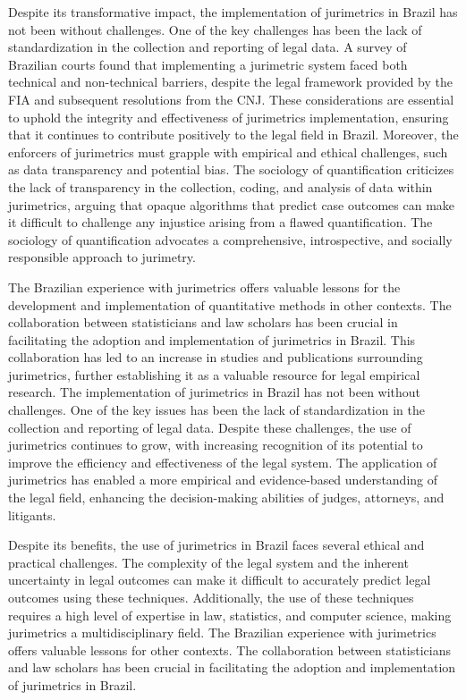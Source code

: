 Despite its transformative impact, the implementation of jurimetrics in Brazil has not been without challenges. One of the key challenges has been the lack of standardization in the collection and reporting of legal data. A survey of Brazilian courts found that implementing a jurimetric system faced both technical and non-technical barriers, despite the legal framework provided by the FIA and subsequent resolutions from the CNJ. These considerations are essential to uphold the integrity and effectiveness of jurimetrics implementation, ensuring that it continues to contribute positively to the legal field in Brazil. Moreover, the enforcers of jurimetrics must grapple with empirical and ethical challenges, such as data transparency and potential bias. The sociology of quantification criticizes the lack of transparency in the collection, coding, and analysis of data within jurimetrics, arguing that opaque algorithms that predict case outcomes can make it difficult to challenge any injustice arising from a flawed quantification. The sociology of quantification advocates a comprehensive, introspective, and socially responsible approach to jurimetry.

The Brazilian experience with jurimetrics offers valuable lessons for the development and implementation of quantitative methods in other contexts. The collaboration between statisticians and law scholars has been crucial in facilitating the adoption and implementation of jurimetrics in Brazil. This collaboration has led to an increase in studies and publications surrounding jurimetrics, further establishing it as a valuable resource for legal empirical research. The implementation of jurimetrics in Brazil has not been without challenges. One of the key issues has been the lack of standardization in the collection and reporting of legal data. Despite these challenges, the use of jurimetrics continues to grow, with increasing recognition of its potential to improve the efficiency and effectiveness of the legal system. The application of jurimetrics has enabled a more empirical and evidence-based understanding of the legal field, enhancing the decision-making abilities of judges, attorneys, and litigants.

Despite its benefits, the use of jurimetrics in Brazil faces several ethical and practical challenges. The complexity of the legal system and the inherent uncertainty in legal outcomes can make it difficult to accurately predict legal outcomes using these techniques. Additionally, the use of these techniques requires a high level of expertise in law, statistics, and computer science, making jurimetrics a multidisciplinary field. The Brazilian experience with jurimetrics offers valuable lessons for other contexts. The collaboration between statisticians and law scholars has been crucial in facilitating the adoption and implementation of jurimetrics in Brazil.

